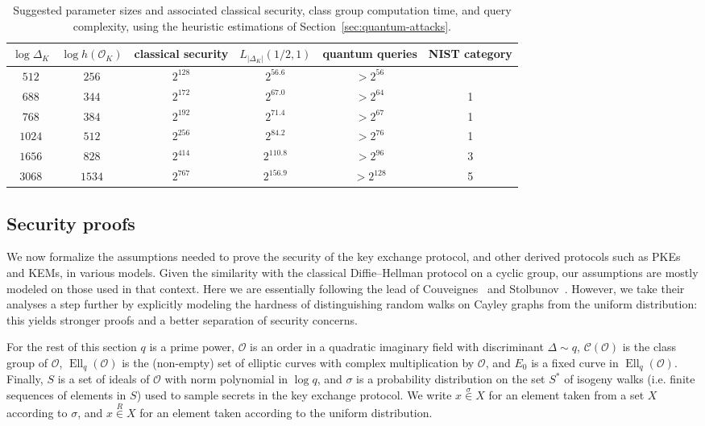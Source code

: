 \documentclass{llncs}
\newcommand{\Cl}{\mathcal{C}}
\renewcommand{\O}{\mathcal{O}}
\newcommand{\rand}[1]{\overset{#1}{∈}}
\newcommand{\uni}{\rand{R}}
\DeclareMathOperator{\Ell}{Ell}
\begin{document}
\begin{table}
    \renewcommand{\arraystretch}{1.4}
    \centering
    \begin{tabular}{c@{\;}|@{\;}c@{\;}|@{\;}c@{\;}|@{\;}c@{\;}|@{\;}c@{\;}|@{\;}c}
        $\log Δ_K$ & $\log h(\O_K)$
        & \parbox{10ex}{\centering classical security}
        & $L_{|Δ_K|}(1/2,1)$ 
        & \parbox{10ex}{\centering quantum queries}
        & \parbox{10ex}{\centering NIST category} \\
        \hline
        $512$  &  $256$ & $2^{128}$ &  $2^{56.6}$ & $> 2^{56}$ \\
        $688$  &  $344$ & $2^{172}$ &  $2^{67.0}$ & $> 2^{64}$ & 1\\
        $768$  &  $384$ & $2^{192}$ &  $2^{71.4}$ & $> 2^{67}$ & 1\\
        $1024$ &  $512$ & $2^{256}$ &  $2^{84.2}$ & $> 2^{76}$ & 1\\
        $1656$ &  $828$ & $2^{414}$ & $2^{110.8}$ & $> 2^{96}$ & 3\\
        $3068$ & $1534$ & $2^{767}$ & $2^{156.9}$ & $> 2^{128}$ & 5
        \\
        \hline
    \end{tabular}
    \smallskip
    \caption{Suggested parameter sizes and associated classical
      security, class group computation time, and query complexity,
      using the heuristic estimations of
      Section~\ref{sec:quantum-attacks}.}
    \label{tab:sizes}
\end{table}

\subsection{Security proofs}
\label{sec:proofs}

We now formalize the assumptions needed to prove the security of the
key exchange protocol, and other derived protocols such as PKEs and
KEMs, in various models. Given the similarity with the classical
Diffie--Hellman protocol on a cyclic group, our assumptions are
mostly modeled on those used in that context. Here we are
essentially following the lead of
Couveignes~\cite{cryptoeprint:2006:291} and
Stolbunov~\cite{Stol,Stolbunov2012}.
However, we take their analyses a
step further by explicitly modeling the hardness of distinguishing
random walks on Cayley graphs from the uniform distribution: this
yields stronger proofs and a better separation of security concerns.

For the rest of this section $q$ is a prime power, $\O$ is an order in
a quadratic imaginary field with discriminant $Δ\sim q$, $\Cl(\O)$ is
the class group of $\O$, $\Ell_q(\O)$ is the (non-empty) set of
elliptic curves with complex multiplication by $\O$, and $E_0$ is a
fixed curve in $\Ell_q(\O)$. Finally, $S$ is a set of ideals of $\O$
with norm polynomial in $\log q$, and $σ$ is a probability
distribution on the set $S^*$ of isogeny walks (i.e. finite
sequences of elements in $S$) used to sample secrets in the key exchange
protocol.  
We write $x\rand{σ} X$ for an element taken from a set $X$
according to $σ$, 
and %
$x\uni X$ for an element taken according to the uniform distribution.
\end{document}
